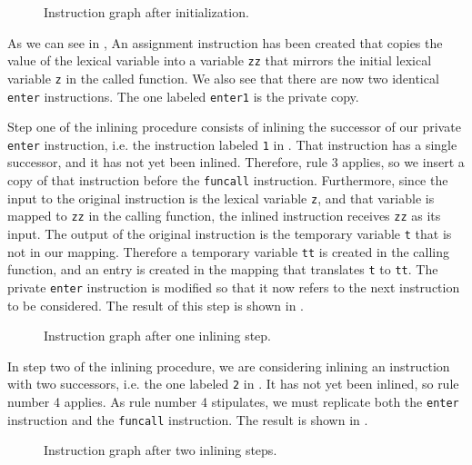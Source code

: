 \begin{figure}
\begin{center}
\end{center}
\caption{\label{fig42}
Instruction graph after initialization.}
\end{figure}

As we can see in , An assignment instruction has been
created that copies the value of the lexical variable into a variable
\texttt{zz} that mirrors the initial lexical variable \texttt{z} in
the called function.  We also see that there are now two identical
\texttt{enter} instructions.  The one labeled \texttt{enter1} is the
private copy.

Step one of the inlining procedure consists of inlining the successor
of our private \texttt{enter} instruction, i.e. the instruction
labeled \texttt{1} in .  That instruction has a single
successor, and it has not yet been inlined.  Therefore, rule 3
applies, so we insert a copy of that instruction before the
\texttt{funcall} instruction.  Furthermore, since the input to the
original instruction is the lexical variable \texttt{z}, and that
variable is mapped to \texttt{zz} in the calling function, the inlined
instruction receives \texttt{zz} as its input.  The output of the
original instruction is the temporary variable \texttt{t} that is not
in our mapping.  Therefore a temporary variable \texttt{tt} is created
in the calling function, and an entry is created in the mapping that
translates \texttt{t} to \texttt{tt}.  The private \texttt{enter}
instruction is modified so that it now refers to the next instruction
to be considered.  The result of this step is shown in .

\begin{figure}
\begin{center}
\end{center}
\caption{\label{fig43}
Instruction graph after one inlining step.}
\end{figure}

In step two of the inlining procedure, we are considering inlining an
instruction with two successors, i.e. the one labeled \texttt{2} in
.  It has not yet been inlined, so rule number 4
applies.  As rule number 4 stipulates, we must replicate both the
\texttt{enter} instruction and the \texttt{funcall} instruction.  The
result is shown in .

\begin{figure}
\begin{center}
\end{center}
\caption{\label{fig44}
Instruction graph after two inlining steps.}
\end{figure}

